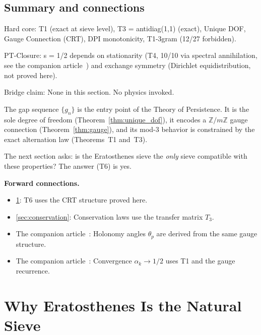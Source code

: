 \documentclass[12pt,a4paper]{article}
\begin{document}
\subsection{Summary and connections}
\label{sec:ch1_summary}

\begin{ledgerbox}
Hard core:
  T1 (exact at sieve level), T3 = antidiag(1,1) (exact), Unique DOF,
  Gauge Connection (CRT), DPI monotonicity, T1-3gram (12/27 forbidden).

PT-Closure:
  s = 1/2 depends on stationarity (T4, 10/10 via spectral annihilation,
  see the companion article~\cite{companion_M3}) and exchange symmetry (Dirichlet equidistribution,
  not proved here).

Bridge claim:
  None in this section. No physics invoked.
\end{ledgerbox}

\medskip

The gap sequence $\{g_n\}$ is the entry point of the Theory of Persistence.
It is the sole degree of freedom (Theorem~\ref{thm:unique_dof}),
it encodes a $\mathbb{Z}/m\mathbb{Z}$ gauge connection
(Theorem~\ref{thm:gauge}), and its mod-3 behavior is constrained
by the exact alternation law (Theorems~T1 and~T3).

The next section asks: is the Eratosthenes sieve the \emph{only}
sieve compatible with these properties? The answer (T6) is yes.

\medskip\noindent\textbf{Forward connections.}
\begin{itemize}
\item \cref{sec:uniqueness}: T6 uses the CRT structure proved here.
\item \cref{sec:conservation}: Conservation laws use the transfer matrix $T_3$.
\item The companion article~\cite{companion_M2}: Holonomy angles $\theta_p$ are derived from the same gauge structure.
\item The companion article~\cite{companion_M3}: Convergence $\alpha_k \to 1/2$ uses T1 and the gauge recurrence.
\end{itemize}


\section{Why Eratosthenes Is the Natural Sieve}
\label{sec:uniqueness}
\end{document}
